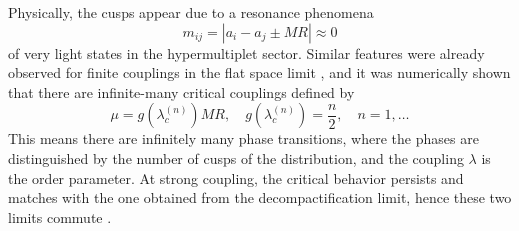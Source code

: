 Physically, the cusps appear due to a resonance phenomena 
\begin{equation}
m_{ij} = |a_i-a_j \pm MR| \approx 0
\end{equation}
of very light states in the hypermultiplet sector.
Similar features were already observed for finite couplings in the flat space limit \cite{Russo:2013qaa},
and it was numerically shown that there are infinite-many critical couplings defined by 
\begin{equation}
 \mu = g(\lambda_c^{(n)}) M R, \quad g(\lambda_c^{(n)}) = \dfrac{n}{2}, \quad n=1,\ldots
\end{equation}
This means there are infinitely many phase transitions, where the phases are distinguished by the number of cusps of the distribution,
and the coupling $\lambda$ is the order parameter.
At strong coupling, the critical behavior persists and matches with the one obtained from the decompactification limit, 
hence these two limits commute \cite{Zarembo:2014ooa}.




